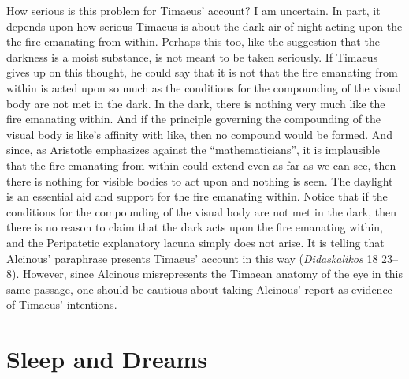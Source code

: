 How serious is this problem for Timaeus' account? I am uncertain. In part, it depends upon how serious Timaeus is about the dark air of night acting upon the the fire emanating from within. Perhaps this too, like the suggestion that the darkness is a moist substance, is not meant to be taken seriously. If Timaeus gives up on this thought, he could say that it is not that the fire emanating from within is acted upon so much as the conditions for the compounding of the visual body are not met in the dark. In the dark, there is nothing very much like the fire emanating within. And if the principle governing the compounding of the visual body is like's affinity with like, then no compound would be formed. And since, as Aristotle emphasizes against the ``mathematicians'', it is implausible that the fire emanating from within could extend even as far as we can see, then there is nothing for visible bodies to act upon and nothing is seen. The daylight is an essential aid and support for the fire emanating within. Notice that if the conditions for the compounding of the visual body are not met in the dark, then there is no reason to claim that the dark acts upon the fire emanating within, and the Peripatetic explanatory lacuna simply does not arise. It is telling that Alcinous' paraphrase presents Timaeus' account in this way (\emph{Didaskalikos} 18 23--8). However, since Alcinous misrepresents the Timaean anatomy of the eye in this same passage, one should be cautious about taking Alcinous' report as evidence of Timaeus' intentions.


\section{Sleep and Dreams} %
\label{sec:sleep_and_dreams}

